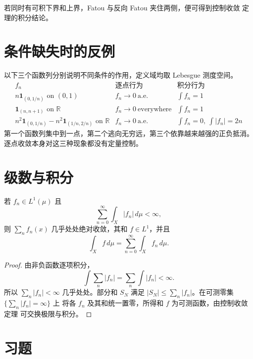 若同时有可积下界和上界，Fatou 与反向 Fatou 夹住两侧，便可得到控制收敛
定理的积分结论。

\section{条件缺失时的反例}

以下三个函数列分别说明不同条件的作用，定义域均取 Lebesgue 测度空间。
\[
\begin{array}{c|c|c}
 f_n & \text{逐点行为} & \text{积分行为}\\ \hline
 n\mathbf1_{(0,1/n)}\text{ on }(0,1)
   & f_n\to0\ \text{a.e.}& \int f_n=1\\
 \mathbf1_{(n,n+1)}\text{ on }\mathbb R
   & f_n\to0\ \text{everywhere}& \int f_n=1\\
 n^2\mathbf1_{(0,1/n)}-n^2\mathbf1_{(1/n,2/n)}\text{ on }\mathbb R
   & f_n\to0\ \text{a.e.}& \int f_n=0,\ \int|f_n|=2n
\end{array}
\]
第一个函数列集中到一点，第二个逃向无穷远，第三个依靠越来越强的正负抵消。
逐点收敛本身对这三种现象都没有定量控制。

\section{级数与积分}

\begin{corollary}
\label{cor:integrable-series-interchange}
若 \(f_n\in L^1(\mu)\) 且
\[
 \sum_{n=0}^{\infty}\int_X|f_n|\,d\mu<\infty,
\]
则 \(\sum_nf_n(x)\) 几乎处处绝对收敛，其和 \(f\in L^1\)，并且
\[
 \int_Xf\,d\mu=\sum_{n=0}^{\infty}\int_Xf_n\,d\mu.
\]
\end{corollary}

\begin{proof}
由非负函数逐项积分，
\[
 \int\sum_n|f_n|=\sum_n\int|f_n|<\infty.
\]
所以 \(\sum_n|f_n|<\infty\) 几乎处处。部分和 \(S_N\) 满足
\(|S_N|\le\sum_n|f_n|\)。在可测零集 \(\{\sum_n|f_n|=\infty\}\) 上
将各 \(f_n\) 及其和统一置零，所得和 \(f\) 为可测函数，由控制收敛定理
可交换极限与积分。
\end{proof}

\section*{习题}

